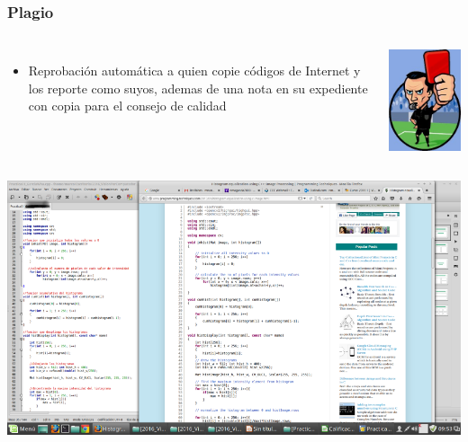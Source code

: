 \begin{frame}
\frametitle{Plagio}
\begin{columns}[c] %
\begin{itemize}
\item Reprobación automática a quien copie códigos de Internet y los reporte como suyos, ademas de una nota en su expediente con copia para el consejo de calidad 
\end{itemize}
\begin{center}
\includegraphics[scale=0.27]{Plagio/tarjeta-roja.jpg}
\end{center}
\end{columns}
\begin{center}
\includegraphics[scale=0.23]{Plagio/Pifia}
\end{center}
\end{frame}

